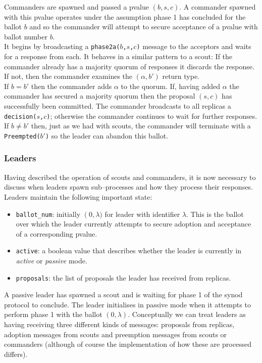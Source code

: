 Commanders are spawned and passed a pvalue $\left(b, s, c \right)$. A commander spawned with this pvalue operates under the assumption phase 1 has concluded for the ballot $b$ and so the commander will attempt to secure acceptance of a pvalue with ballot number $b$. \\

It begins by broadcasting a \texttt{phase2a($b$,$s$,$c$)} message to the acceptors and waits for a response from each. It behaves in a similar pattern to a scout: If the commander already has a majority quorum of responses it discards the response. If not, then the commander examines the $\left(\alpha, b' \right)$ return type. \\

If $b = b'$ then the commander adds $\alpha$ to the quorum. If, having added $\alpha$ the commander has secured a majority quorum then the proposal $(s,c)$ has successfully been committed. The commander broadcasts to all replicas a \texttt{decision($s$,$c$)}; otherwise the commander continues to wait for further responses. \\

If $b \neq b'$ then, just as we had with scouts, the commander will terminate with a  \texttt{Preempted($b'$)} so the leader can abandon this ballot.

\subsubsection{Leaders}

Having described the operation of scouts and commanders, it is now necessary to discuss when leaders spawn sub--processes and how they process their responses. Leaders maintain the following important state:

\begin{itemize}
  \item \texttt{ballot\_num}: initially $\left(0,\lambda)$ for leader with identifier $\lambda$. This is the ballot over which the leader currently attempts to secure adoption and acceptance of a corresponding pvalue.
  \item \texttt{active}: a boolean value that describes whether the leader is currently in \emph{active} or \emph{passive} mode.
  \item \texttt{proposals}: the list of proposals the leader has received from replicas.
\end{itemize}

A passive leader has spawned a scout and is waiting for phase 1 of the synod protocol to conclude. The leader initialises in passive mode when it attempts to perform phase 1 with the ballot $\left(0, \lambda \right)$. {\color{red}Conceptually we can treat leaders as having receiving three different kinds of messages: proposals from replicas, adoption messages from scouts and preemption messages from scouts or commanders (although of course the implementation of how these are processed differs). }\\

